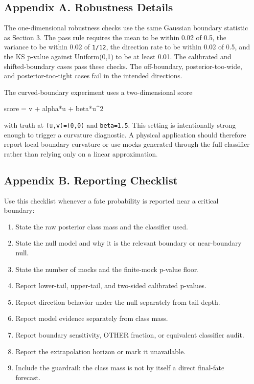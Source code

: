 \documentclass[
]{article}
\newenvironment{Shaded}{}{}
\newcommand{\NormalTok}[1]{#1}
\providecommand{\tightlist}{%
  \setlength{\itemsep}{0pt}\setlength{\parskip}{0pt}}
\begin{document}
\subsection{Appendix A. Robustness
Details}\label{appendix-a.-robustness-details}

The one-dimensional robustness checks use the same Gaussian boundary
statistic as Section 3. The pass rule requires the mean to be within
0.02 of 0.5, the variance to be within 0.02 of \texttt{1/12}, the
direction rate to be within 0.02 of 0.5, and the KS p-value against
Uniform(0,1) to be at least 0.01. The calibrated and shifted-boundary
cases pass these checks. The off-boundary, posterior-too-wide, and
posterior-too-tight cases fail in the intended directions.

The curved-boundary experiment uses a two-dimensional score

\begin{Shaded}
\begin{Highlighting}[]
\NormalTok{score = v + alpha*u + beta*u\^{}2}
\end{Highlighting}
\end{Shaded}

with truth at \texttt{(u,v)=(0,0)} and \texttt{beta=1.5}. This setting
is intentionally strong enough to trigger a curvature diagnostic. A
physical application should therefore report local boundary curvature or
use mocks generated through the full classifier rather than relying only
on a linear approximation.

\subsection{Appendix B. Reporting
Checklist}\label{appendix-b.-reporting-checklist}

Use this checklist whenever a fate probability is reported near a
critical boundary:

\begin{enumerate}
\def\labelenumi{\arabic{enumi}.}
\tightlist
\item
  State the raw posterior class mass and the classifier used.
\item
  State the null model and why it is the relevant boundary or
  near-boundary null.
\item
  State the number of mocks and the finite-mock p-value floor.
\item
  Report lower-tail, upper-tail, and two-sided calibrated p-values.
\item
  Report direction behavior under the null separately from tail depth.
\item
  Report model evidence separately from class mass.
\item
  Report boundary sensitivity, OTHER fraction, or equivalent classifier
  audit.
\item
  Report the extrapolation horizon or mark it unavailable.
\item
  Include the guardrail: the class mass is not by itself a direct
  final-fate forecast.
\end{enumerate}
\end{document}

